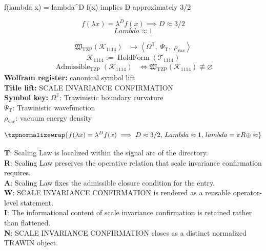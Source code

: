 
\begin{tzpsnapshot}
\end{tzpsnapshot}

f(lambda x) = lambda\textasciicircum{}D f(x) implies D approximately 3/2

\[
f(\lambda x) = \lambda^D f(x) \implies D \approx 3/2
\]
\[
Lambda \approx 1
\]

\noindent
\begin{minipage}[t]{0.48\linewidth}
\begingroup
\small
\[
\begin{aligned}
\mathfrak{W}_{\mathrm{TZP}}\!\left(\mathcal{K}_{1114}\right)
&\longmapsto
\left\langle \Omega^{\mathbb{T}},\; \Psi_{\mathrm{T}},\; \rho_{\mathrm{vac}} \right\rangle
\end{aligned}
\]
\[
\mathcal{K}_{1114}
:=
\operatorname{HoldForm}\!\left(\mathcal{T}_{1114}\right)
\]
\[
\begin{aligned}
\operatorname{Admissible}_{\mathrm{TZP}}\!\left(\mathcal{K}_{1114}\right)
&\Longleftrightarrow
\mathfrak{W}_{\mathrm{TZP}}\!\left(\mathcal{K}_{1114}\right)\not\equiv\varnothing
\end{aligned}
\]
\textbf{Wolfram register:} canonical symbol lift\\
\textbf{Title lift:} SCALE INVARIANCE CONFIRMATION\\
\textbf{Symbol key:} \(\Omega^{\mathbb{T}}\): Trawinistic boundary curvature\\ \(\Psi_{\mathrm{T}}\): Trawinistic wavefunction\\ \(\rho_{\mathrm{vac}}\): vacuum energy density
\par
\endgroup
\end{minipage}\hfill
\begin{minipage}[t]{0.48\linewidth}
\[
\tzpnormalizewrap{f(\lambda x) = \lambda^D f(x) \implies D \approx 3/2,\,Lambda \approx 1,\,lambda=\pi R\oplus\approx}
\]

\small
\textbf{T}: Scaling Law is localized within the signal arc of the directory.\\
\textbf{R}: Scaling Law preserves the operative relation that scale invariance confirmation requires.\\
\textbf{A}: Scaling Law fixes the admissible closure condition for the entry.\\
\textbf{W}: SCALE INVARIANCE CONFIRMATION is rendered as a reusable operator-level statement.\\
\textbf{I}: The informational content of scale invariance confirmation is retained rather than flattened.\\
\textbf{N}: SCALE INVARIANCE CONFIRMATION closes as a distinct normalized TRAWIN object.
\normalsize
\end{minipage}

